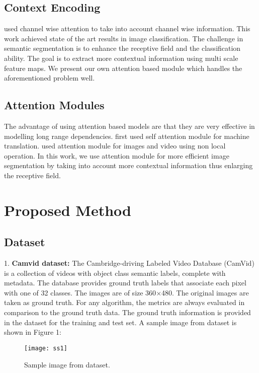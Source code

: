 \documentclass{article}
\begin{document}
\subsection{Context Encoding}

\citep{hu2018squeeze} used channel wise attention to take into account channel wise information. This work achieved state of the art results in image classification. The challenge in semantic segmentation is to enhance the receptive field and the classification ability. The goal is to extract more contextual information using multi scale feature maps. We present our own attention based module which handles the aforementioned problem well.

\subsection{Attention Modules}

The advantage of using attention based models are that they are very effective in modelling long range dependencies. \citep{vaswani2017attention} first used self attention module for machine translation. \citep{wang2018non} used attention module for images and video using non local operation. In this work, we use attention module for more efficient image segmentation by taking into account more contextual information thus enlarging the receptive field.

\section{Proposed Method}

\subsection{Dataset}

1. \textbf{Camvid dataset:} The Cambridge-driving Labeled Video Database (CamVid) is a collection of videos with object class semantic labels, complete with metadata. The database provides ground truth labels that associate each pixel with one of 32 classes. The images are of size 360$\times$480. The original images are taken as ground truth. For any algorithm, the metrics are always evaluated in comparison to the ground truth data. The ground truth information is provided in the dataset for the training and test set. A sample image from dataset is shown in Figure 1:

\begin{figure}[htp]
    \centering
    \texttt{[image: ss1]}
    \caption{Sample image from dataset.}
    \label{fig3}
\end{figure}
\end{document}
